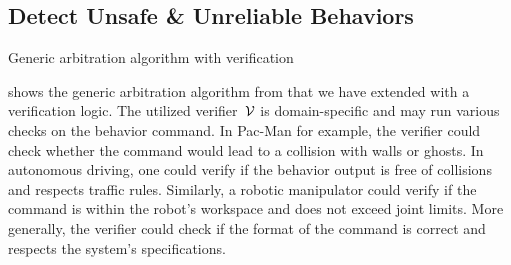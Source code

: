\subsection{Detect Unsafe \& Unreliable Behaviors}
\begin{algorithm}

  \Fn{\BestOption{situation $\situation$}}{\label{algo:verifying_arbitrator:bestOption}
    filter applicable options $\applicableOptions \subset \options$\;
    sort applicable options
      $\sortedApplicableOptions = \left< a_0, a_1, \dots \right> = \text{strategie}(\applicableOptions)$\;

    \For{$a \in \sortedApplicableOptions$}{
      get command $\command_a = \getCommand_a(\situation)$\;

      verify $\verification_a = \verifier (\command_a)$\;
      \If{verification passed $\verification_a = 0$}{%
        \KwRet{$(\command_a, \verification_a)$}\;
      }
    }

    \KwRet{$(\emptyset, \text{NO\_SAFE\_OPTION})$}\;
    }
  \;
  \caption{Generic arbitration algorithm with verification \label{algo:verifying_arbitrator}}
\end{algorithm}

 shows the generic arbitration algorithm from \cite{lauer}
that we have extended with a verification logic.
The utilized verifier~$\mathcal{V}$ is domain-specific and may run various checks on the behavior command.
In Pac-Man for example, the verifier could check whether the command would lead to a collision with walls or ghosts.
In autonomous driving, one could verify if the behavior output is free of collisions and respects traffic rules.
Similarly, a robotic manipulator could verify if the command is within the robot's workspace and does not exceed joint limits.
More generally, the verifier could check if the format of the command is correct and respects the system's specifications.

